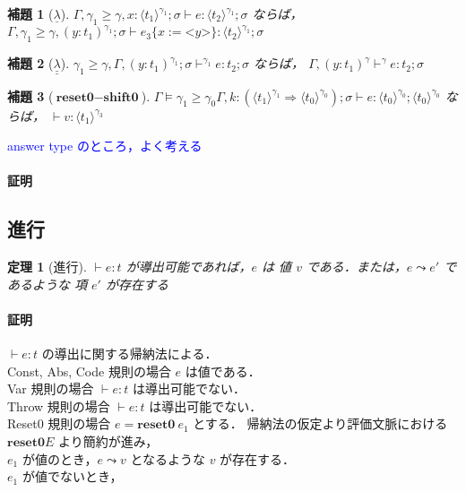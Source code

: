 \documentclass[10pt,a4j]{jarticle}
\newcommand\blue[1]{\textcolor{blue}{#1}}
\newcommand\Resetz{\textbf{reset0}}
\newcommand\Shiftz{\textbf{shift0}}
\newcommand\cfun[2]{\underline{\lambda}{#1}.{#2}}
\newcommand\ccfun[2]{\underline{\underline{\lambda}}{#1}.{#2}}
\newcommand\code[1]{\texttt{<}{#1}\texttt{>}}
\newcommand\codeT[2]{\langle{#1}\rangle^{#2}}
\newcommand\contT[2]{({#1} \Rightarrow {#2})}
\newcommand\ord{\ge}
\newcommand\lto{\leadsto}
\newcommand\ooi[1]{\blue{{#1}}}
\theoremstyle{break}
\newtheorem{theo}{定理}[section]
\newtheorem{lemm}{補題}[section]
\begin{document}




\begin{lemm}[$\underline{\lambda}$]
  $\Gamma, \gamma_1 \ord \gamma, x : \codeT{t_1}{\gamma_1} ; \sigma \vdash e : \codeT{t_2}{\gamma_1} ; \sigma$
  ならば，
  $\Gamma, \gamma_1 \ord \gamma, (y : t_1)^{\gamma_1} ; \sigma \vdash e_3\{x:=\code{y}\} : \codeT{t_2}{\gamma_1} ; \sigma$
\end{lemm}

\begin{lemm}[$\underline{\underline{\lambda}}$]
  $\gamma_1 \ord \gamma, \Gamma, (y : t_1)^{\gamma_1} ; \sigma \vdash^{\gamma_1} e : t_2 ; \sigma$
  ならば，
  $\Gamma, (y : t_1)^{\gamma} \vdash^{\gamma} e : t_2 ; \sigma$
\end{lemm}

\begin{lemm}[$\Resetz - \Shiftz$]
  $\Gamma \models \gamma_1 \ord \gamma_0  \Gamma, k : \contT{\codeT{t_1}{\gamma_1}}{\codeT{t_0}{\gamma_0}} ; \sigma \vdash e : \codeT{t_0}{\gamma_0} ; \codeT{t_0}{\gamma_0}$
  ならば，
  $\vdash v : \codeT{t_1}{\gamma_3}$
\end{lemm}

\ooi{answer type のところ，よく考える}

\paragraph{証明}


\subsection{進行}
\begin{theo}[進行]
  $\vdash e:t$ が導出可能であれば，$e$ は 値 $v$ である．または，$e \lto e'$ であるような 項 $e'$ が存在する
\end{theo}

\paragraph{証明}
$\vdash e:t$ の導出に関する帰納法による．\\
Const, Abs, Code 規則の場合 $e$ は値である．\\
Var 規則の場合 $\vdash e:t$ は導出可能でない．\\
Throw 規則の場合 $\vdash e:t$ は導出可能でない．\\
Reset0 規則の場合 $e = \Resetz~ e_1$ とする．
帰納法の仮定より評価文脈における $\Resetz E$ より簡約が進み，\\
$e_1$ が値のとき，$e \lto v$ となるような $v$ が存在する．\\
$e_1$ が値でないとき，
\end{document}
